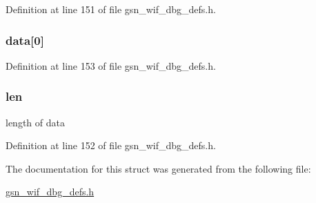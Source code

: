 Definition at line 151 of file gsn\_\-wif\_\-dbg\_\-defs.h.

\hypertarget{a00330_a29500e452cff835f2b70d1dff36f918a}{
\subsubsection[{data}]{ {\bf data}\mbox{[}0\mbox{]}}}
\label{a00330_a29500e452cff835f2b70d1dff36f918a}


Definition at line 153 of file gsn\_\-wif\_\-dbg\_\-defs.h.

\hypertarget{a00330_ab9abc6ede61238a05664f9c37e4412c3}{
\subsubsection[{len}]{ {\bf len}}}
\label{a00330_ab9abc6ede61238a05664f9c37e4412c3}
length of data 

Definition at line 152 of file gsn\_\-wif\_\-dbg\_\-defs.h.



The documentation for this struct was generated from the following file:\begin{DoxyCompactItemize}
\item 
\hyperlink{a00609}{gsn\_\-wif\_\-dbg\_\-defs.h}\end{DoxyCompactItemize}
